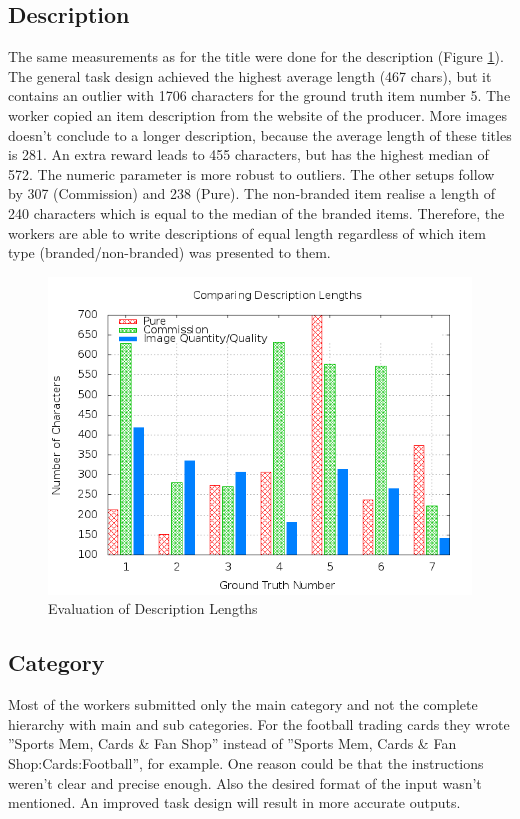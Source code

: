 \subsection{Description}
The same measurements as for the title were done for the description (Figure \ref{crowdsourcing_desc_length}). The general task design achieved the highest average length (467 chars), but it contains an outlier with 1706 characters for the ground truth item number 5. The worker copied an item description from the website of the producer. More images doesn't conclude to a longer description, because the average length of these titles is 281. An extra reward leads to 455 characters, but has the highest median of 572. The numeric parameter is more robust to outliers. The other setups follow by 307 (Commission) and 238 (Pure). The non-branded item realise a length of 240 characters which is equal to the median of the branded items. Therefore, the workers are able to write descriptions of equal length regardless of which item type (branded/non-branded) was presented to them.
\begin{figure}
\centering
\includegraphics[scale=0.55]{images/plots/crowdsourcing/plot_description_length.png}
\caption{Evaluation of Description Lengths}
\label{crowdsourcing_desc_length}
\end{figure}

\subsection{Category}
Most of the workers submitted only the main category and not the complete hierarchy with main and sub categories. For the football trading cards they wrote ''Sports Mem, Cards \& Fan Shop'' instead of ''Sports Mem, Cards \& Fan Shop:Cards:Football'', for example. One reason could be that the instructions weren't clear and precise enough. Also the desired format of the input wasn't mentioned. An improved task design will result in more accurate outputs.
